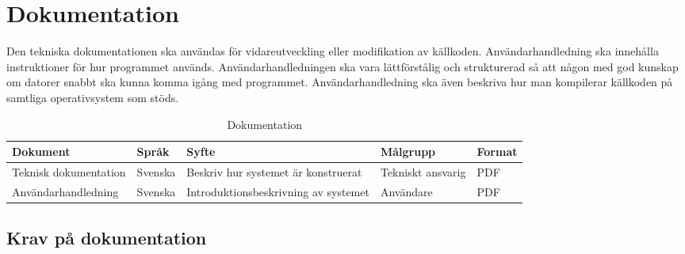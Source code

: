\section{Dokumentation}
Den tekniska dokumentationen ska användas för vidareutveckling eller modifikation av källkoden. Användarhandledning ska innehålla instruktioner för hur programmet används. Användarhandledningen ska vara lättförstålig och strukturerad så att någon med god kunskap om datorer snabbt ska kunna komma igång med programmet. Användarhandledning ska även beskriva hur man kompilerar källkoden på samtliga operativsystem som stöds.
	\begin{table}[h]
	\centering
		\begin{tabularx}{\textwidth}{| l | l | X | l | l |}
			\hline
			\textbf{Dokument} & \textbf{Språk} & \textbf{Syfte} & \textbf{Målgrupp} & \textbf{Format} \\
			\hline
			Teknisk dokumentation & Svenska & Beskriv hur systemet är konstruerat & Tekniskt ansvarig & PDF \\
			\hline
			Användarhandledning & Svenska & Introduktionsbeskrivning av systemet & Användare & PDF \\
			\hline
		\end{tabularx}
	\caption{Dokumentation} \label{dokumentation:tabell}
	\end{table}

\subsection{Krav på dokumentation}
\begin{LIPSkravlista}
\end{LIPSkravlista}
